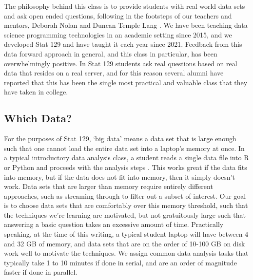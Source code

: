 \documentclass[12pt]{article}
\begin{document}
The philosophy behind this class is to provide students with real world data sets and ask open ended questions, following in the footsteps of our teachers and mentors, Deborah Nolan and Duncan Temple Lang \cite{nolan2010computing}.
We have been teaching data science programming technologies in an academic setting since 2015, and we developed Stat 129 and have taught it each year since 2021.
Feedback from this data forward approach in general, and this class in particular, has been overwhelmingly positive.
In Stat 129 students ask real questions based on real data that resides on a real server, and for this reason several alumni have reported that this has been the single most practical and valuable class that they have taken in college.

\subsection{Which Data?}
\label{sec:data}

For the purposes of Stat 129, `big data' means a data set that is large enough such that one cannot load the entire data set into a laptop's memory at once.
In a typical introductory data analysis class, a student reads a single data file into R or Python and proceeds with the analysis steps \cite{dsbox}.
This works great if the data fits into memory, but if the data does not fit into memory, then it simply doesn't work.
Data sets that are larger than memory require entirely different approaches, such as streaming through to filter out a subset of interest.
Our goal is to choose data sets that are comfortably over this memory threshold, such that the techniques we're learning are motivated, but not gratuitously large such that answering a basic question takes an excessive amount of time.
Practically speaking, at the time of this writing, a typical student laptop will have between 4 and 32 GB of memory, and data sets that are on the order of 10-100 GB on disk work well to motivate the techniques.
We assign common data analysis tasks that typically take 1 to 10 minutes if done in serial, and are an order of magnitude faster if done in parallel.
\end{document}
